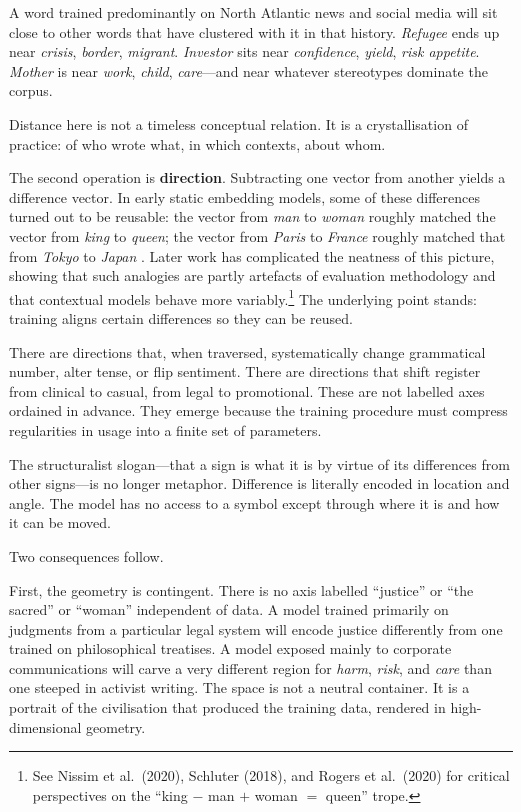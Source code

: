 \documentclass[12pt,a4paper]{article}
\begin{document}
A word trained predominantly on North Atlantic news and social media will sit close to other words that have clustered with it in that history. \emph{Refugee} ends up near \emph{crisis}, \emph{border}, \emph{migrant}. \emph{Investor} sits near \emph{confidence}, \emph{yield}, \emph{risk appetite}. \emph{Mother} is near \emph{work}, \emph{child}, \emph{care}---and near whatever stereotypes dominate the corpus.

Distance here is not a timeless conceptual relation. It is a crystallisation of practice: of who wrote what, in which contexts, about whom.

The second operation is \textbf{direction}. Subtracting one vector from another yields a difference vector. In early static embedding models, some of these differences turned out to be reusable: the vector from \emph{man} to \emph{woman} roughly matched the vector from \emph{king} to \emph{queen}; the vector from \emph{Paris} to \emph{France} roughly matched that from \emph{Tokyo} to \emph{Japan} \cite{mikolov2013,pennington2014}. Later work has complicated the neatness of this picture, showing that such analogies are partly artefacts of evaluation methodology and that contextual models behave more variably.\footnote{See Nissim et al.\ (2020), Schluter (2018), and Rogers et al.\ (2020) for critical perspectives on the ``king $-$ man $+$ woman $=$ queen'' trope.} The underlying point stands: training aligns certain differences so they can be reused.

There are directions that, when traversed, systematically change grammatical number, alter tense, or flip sentiment. There are directions that shift register from clinical to casual, from legal to promotional. These are not labelled axes ordained in advance. They emerge because the training procedure must compress regularities in usage into a finite set of parameters.

The structuralist slogan---that a sign is what it is by virtue of its differences from other signs---is no longer metaphor. Difference is literally encoded in location and angle. The model has no access to a symbol except through where it is and how it can be moved.

Two consequences follow.

First, the geometry is contingent. There is no axis labelled ``justice'' or ``the sacred'' or ``woman'' independent of data. A model trained primarily on judgments from a particular legal system will encode justice differently from one trained on philosophical treatises. A model exposed mainly to corporate communications will carve a very different region for \emph{harm}, \emph{risk}, and \emph{care} than one steeped in activist writing. The space is not a neutral container. It is a portrait of the civilisation that produced the training data, rendered in high-dimensional geometry.
\end{document}
